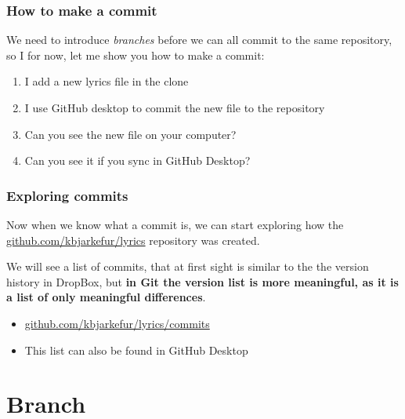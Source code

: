 \documentclass[aspectratio=169]{beamer} %
\newcommand{\trainingURL}[1]{{\color{blue}\url{#1}}}
\newcommand{\traininerUsername}{kbjarkefur}
\newcommand{\repoName}{\traininerUsername/lyrics}
\newcommand{\trainingRepoURL}[1]{\trainingURL{github.com/\repoName #1}}
\begin{document}
\begin{frame}
\frametitle{How to make a commit}

	We need to introduce \textit{branches} before we can all commit to the same repository, so I for now, let me show you how to make a commit:

	\begin{enumerate}
		\item I add a new lyrics file in the clone
		\item I use GitHub desktop to commit the new file to the repository
		\item Can you see the new file on your computer?
		\item Can you see it if you sync in GitHub Desktop?
	\end{enumerate}

\end{frame}


\begin{frame}
\frametitle{Exploring commits}

	Now when we know what a commit is, we can start exploring how the \trainingRepoURL{} repository was created.

	\vspace{.25cm}

	We will see a list of commits, that at first sight is similar to the the version history in DropBox, but \textbf{in Git the version list is more meaningful, as it is a list of only meaningful differences}.

	\vspace{.25cm}

	\begin{itemize}
		\item \trainingRepoURL{/commits}
		\item This list can also be found in GitHub Desktop
	\end{itemize}

\end{frame}

\section{Branch}
\end{document}
